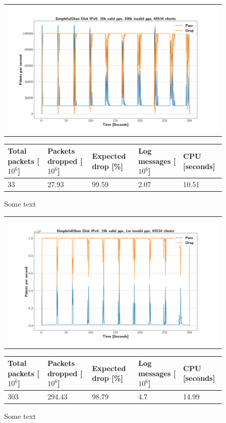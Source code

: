 \begin{figure}[p]
	\label{fig:simplefail2ban:disk:ip4:100k}
	\centering
	\scriptsize
	\begin{tabular}{c}
    	\centerline{\includegraphics[width=1.2\textwidth]{images/simplefail2ban_disk_ipv4_v10k_iv100k_c65534.png}}
	\end{tabular}
	\begin{tabular}{lllll}
		\toprule
		\textbf{Total packets [$10^6$]} & \textbf{Packets dropped [$10^6$]} & \textbf{Expected drop [\%]} & \textbf{Log messages [$10^6$]} & \textbf{CPU [seconds]} \\ \midrule 
		33 & 27.93 & 99.59 & 2.07 & 10.51 \\
		\bottomrule
	\end{tabular}
	\caption[Simplefail2ban Logfile IPv4 100k pps]{Some text}
\end{figure}

\begin{figure}[p]
	\label{fig:simplefail2ban:disk:ip4:1m}
	\centering
	\scriptsize
	\begin{tabular}{c}
    	\centerline{\includegraphics[width=1.2\textwidth]{images/simplefail2ban_disk_ipv4_v10k_iv1m_c65534.png}}
    \end{tabular}
	\begin{tabular}{lllll}
		\toprule
		\textbf{Total packets [$10^6$]} & \textbf{Packets dropped [$10^6$]} & \textbf{Expected drop [\%]} & \textbf{Log messages [$10^6$]} & \textbf{CPU [seconds]} \\ \midrule 
		303 & 294.43 & 98.79 & 4.7 & 14.99 \\
		\bottomrule
	\end{tabular}
	\caption[Simplefail2ban Logfile IPv4 1m PPS]{Some text}
\end{figure}

